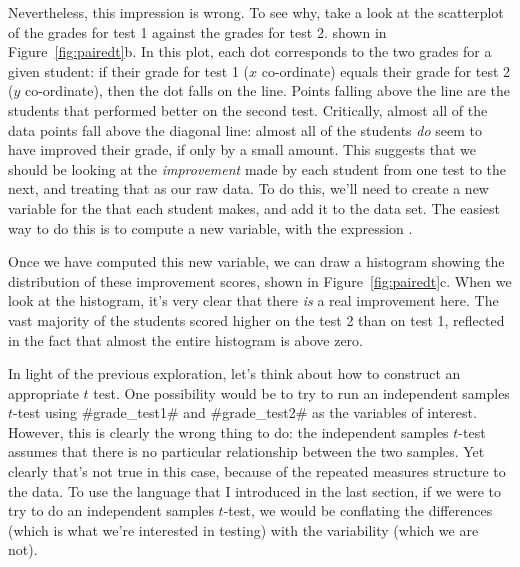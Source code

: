 Nevertheless, this impression is wrong. To see why, take a look at the scatterplot of the grades for test 1 against the grades for test 2.  shown in Figure~\ref{fig:pairedt}b. In this plot, each dot corresponds to the two grades for a given student: if their grade for test 1 ($x$ co-ordinate) equals their grade for test 2 ($y$ co-ordinate), then the dot falls on the line. Points falling above the line are the students that performed better on the second test. Critically, almost all of the data points fall above the diagonal line: almost all of the students {\it do} seem to have improved their grade, if only by a small amount. This suggests that we should be looking at the {\it improvement} made by each student from one test to the next, and treating that as our raw data. To do this, we'll need to create a new variable for the  that each student makes, and add it to the  data set. The easiest way to do this is to compute a new variable, with the expression .

Once we have computed this new  variable, we can draw a histogram showing the distribution of these improvement scores, shown in Figure~\ref{fig:pairedt}c. When we look at the  histogram, it's very clear that there {\it is} a real improvement here. The vast majority of the students scored higher on the test 2 than on test 1, reflected in the fact that almost the entire histogram is above zero. 



In light of the previous exploration, let's think about how to construct an appropriate $t$ test. One possibility would be to try to run an independent samples $t$-test using \rtextverb#grade_test1# and \rtextverb#grade_test2# as the variables of interest. However, this is clearly the wrong thing to do: the independent samples $t$-test assumes that there is no particular relationship between the two samples. Yet clearly that's not true in this case, because of the repeated measures structure to the data. To use the language that I introduced in the last section, if we were to try to do an independent samples $t$-test, we would be conflating the  differences (which is what we're interested in testing) with the  variability (which we are not). 

